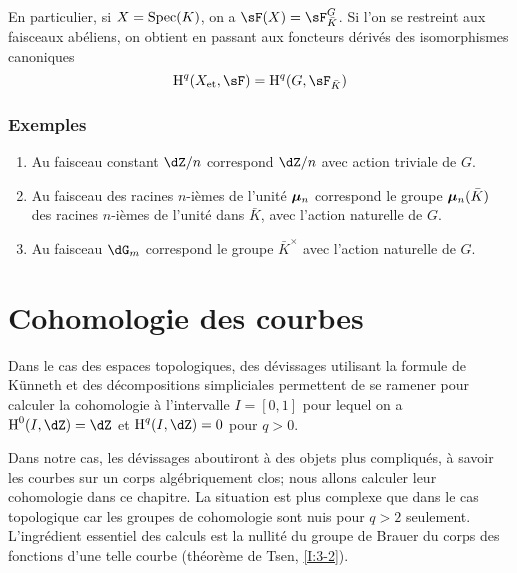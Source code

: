 En particulier, si $X=\operatorname{Spec}(K)$, on a $\sF(X) = \sF_{\bar K}^G$. Si l'on se 
restreint aux faisceaux abéliens, on obtient en passant aux foncteurs 
dérivés des isomorphismes canoniques 
\[
  \h^q(\et X,\sF) = \h^q(G,\sF_{\bar K})
\]





\subsubsection{Exemples}\label{I:2-4-5}

\begin{enumerate}[\indent a)]
  \item Au faisceau constant $\dZ/n$ correspond $\dZ/n$ avec action triviale de 
    $G$. 
  \item Au faisceau des racines $n$-ièmes de l'unité ${\bm\mu}_n$ correspond 
    le groupe ${\bm\mu}_n(\bar K)$ des racines $n$-ièmes de l'unité dans 
    $\bar K$, avec l'action naturelle de $G$.
  \item Au faisceau $\dG_m$ correspond le groupe $\bar K^\times$ avec l'action 
    naturelle de $G$.
\end{enumerate}




















\section{Cohomologie des courbes}\label{I:3}

Dans le cas des espaces topologiques, des dévissages utilisant la formule de 
K\"unneth et des décompositions simpliciales permettent de se ramener pour 
calculer la cohomologie à l'intervalle $I=[0,1]$ pour lequel on a 
$\h^0(I,\dZ)=\dZ$ et $\h^q(I,\dZ)=0$ pour $q>0$. 

Dans notre cas, les dévissages aboutiront à des objets plus compliqués, 
à savoir les courbes sur un corps algébriquement clos; nous allons calculer 
leur cohomologie dans ce chapitre. La situation est plus complexe que dans le 
cas topologique car les groupes de cohomologie sont nuis pour $q>2$ seulement. 
L'ingrédient essentiel des calculs est la nullité du groupe de Brauer du 
corps des fonctions d'une telle courbe (théorème de Tsen, \ref{I:3-2}). 










